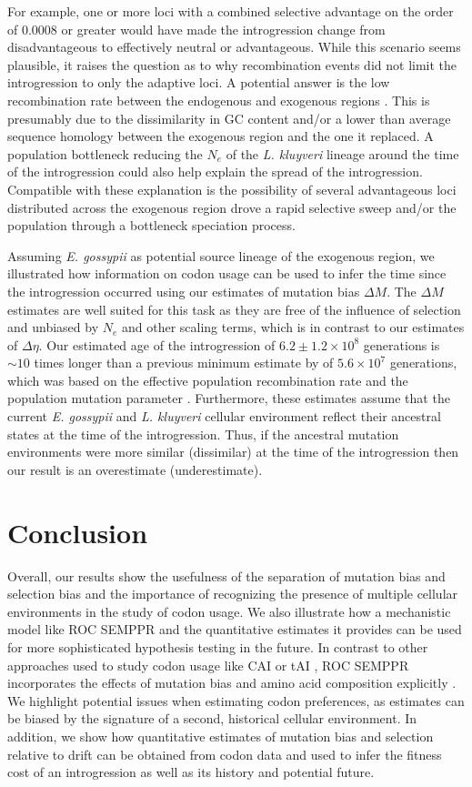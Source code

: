 \documentclass{bmcart}
\newcommand{\kluyveri}{\textit{L. kluyveri}\xspace}
\newcommand{\gossypii}{\textit{E. gossypii}\xspace}
\newcommand{\ROC}{ROC SEMPPR\xspace}
\newcommand{\GC}{GC content\xspace}
\newcommand{\DM}{\ensuremath{{\Delta M}}\xspace}
\newcommand{\DE}{\ensuremath{{\Delta \eta}}\xspace}
\newcommand{\Ne}{\ensuremath{N_e}\xspace}
\begin{document}
For example, one or more loci with a combined selective advantage on the order of $0.0008$ or greater would have made the introgression change from disadvantageous to effectively neutral or advantageous.
While this scenario seems plausible, it raises the question as to why recombination events did not limit the introgression to only the adaptive loci.
A potential answer is the low recombination rate between the endogenous and exogenous regions \cite{payen2009, brion2017}.
This is presumably due to the dissimilarity in \GC and/or a lower than average sequence homology between the exogenous region and the one it replaced.
A population bottleneck reducing the \Ne of the \kluyveri lineage around the time of the introgression could also help explain the spread of the introgression.
Compatible with these explanation is the possibility of several advantageous loci distributed across the exogenous region drove a rapid selective sweep and/or the population through a bottleneck speciation process.


Assuming \gossypii as potential source lineage of the exogenous region, we illustrated how information on codon usage can be used to infer the time since the introgression occurred using our estimates of mutation bias \DM.
The \DM estimates are well suited for this task as they are free of the influence of selection and unbiased by $\Ne$ and other scaling terms, which is in contrast to our estimates of \DE \citep{gilchrist2015}.
Our estimated age of the introgression of $6.2\pm1.2\times 10^8$ generations is $\sim 10$ times longer than a previous minimum estimate by \cite{friedrich2015} of $5.6\times 10^7$ generations, which was based on the effective population recombination rate and the population mutation parameter \citep{Ruderfer2006}.
Furthermore, these estimates assume that the current \gossypii and \kluyveri cellular environment reflect their ancestral states at the time of the introgression.
Thus, if the ancestral mutation environments were more similar (dissimilar) at the time of the introgression then our result is an overestimate (underestimate).

\section*{Conclusion}
Overall, our results show the usefulness of the separation of mutation bias and selection bias and the importance of recognizing the presence of multiple cellular environments in the study of codon usage.
We also illustrate how a mechanistic model like \ROC and the quantitative estimates it provides can be used for more sophisticated hypothesis testing in the future.
In contrast to other approaches used to study codon usage like CAI \citep{sharp1987} or tAI \citep{dosreis2004}, \ROC incorporates the effects of mutation bias and amino acid composition explicitly \citep{cope2018}.
We highlight potential issues when estimating codon preferences, as estimates can be biased by the signature of a second, historical cellular environment.
In addition, we show how quantitative estimates of mutation bias and selection relative to drift can be obtained from codon data and used to infer the fitness cost of an introgression as well as its history and potential future.
\end{document}
